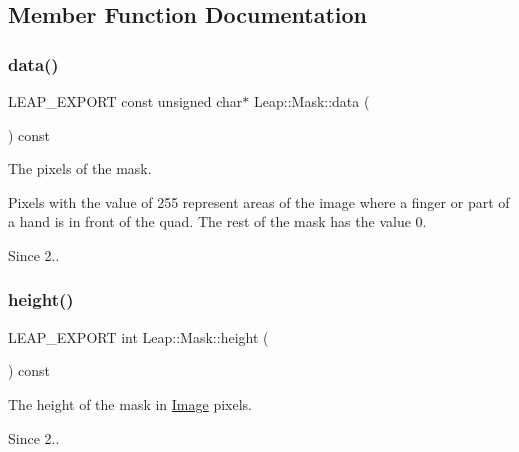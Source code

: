 \subsection{Member Function Documentation}
\mbox{\label{class_leap_1_1_mask_abea2ed1fae02f57711c550a3729ea39f}} 
\subsubsection{\texorpdfstring{data()}{data()}}
{\footnotesize\ttfamily L\+E\+A\+P\+\_\+\+E\+X\+P\+O\+RT const unsigned char$\ast$ Leap\+::\+Mask\+::data (\begin{DoxyParamCaption}{ }\end{DoxyParamCaption}) const}

The pixels of the mask.

Pixels with the value of 255 represent areas of the image where a finger or part of a hand is in front of the quad. The rest of the mask has the value 0. 
\begin{DoxyCodeInclude}
\end{DoxyCodeInclude}
 \begin{DoxySince}{Since}
2.. 
\end{DoxySince}
\mbox{\label{class_leap_1_1_mask_a29f50a387a54fe4b54529b0afc0ce96d}} 
\subsubsection{\texorpdfstring{height()}{height()}}
{\footnotesize\ttfamily L\+E\+A\+P\+\_\+\+E\+X\+P\+O\+RT int Leap\+::\+Mask\+::height (\begin{DoxyParamCaption}{ }\end{DoxyParamCaption}) const}

The height of the mask in \hyperlink{class_leap_1_1_image}{Image} pixels. 
\begin{DoxyCodeInclude}
\end{DoxyCodeInclude}
 \begin{DoxySince}{Since}
2.. 
\end{DoxySince}
\mbox{\label{class_leap_1_1_mask_abc851fccb2981f034194506b9fee69c2}} 
